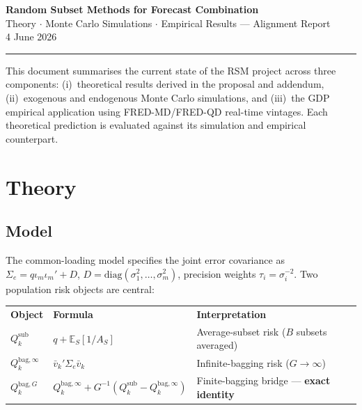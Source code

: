 \documentclass[11pt,a4paper]{article}
\newcommand{\Qbaginf}{Q_k^{\mathrm{bag},\infty}}
\newcommand{\Qbag}{Q_k^{\mathrm{bag},G}}
\newcommand{\Qsub}{Q_k^{\mathrm{sub}}}
\newcommand{\Sige}{\Sigma_e}
\begin{document}
\begin{center}
  {\LARGE\bfseries\color{myblue} Random Subset Methods for Forecast Combination}\\[6pt]
  {\large\color{dgrey} Theory \(\cdot\) Monte Carlo Simulations \(\cdot\) Empirical Results — Alignment Report}\\[4pt]
  {\normalsize\color{dgrey} 4 June 2026}
\end{center}
\vspace{-4pt}
{\color{myblue}\hrule height 1.5pt}
\vspace{8pt}

\noindent
This document summarises the current state of the RSM project across three components:
(i)~theoretical results derived in the proposal and addendum,
(ii)~exogenous and endogenous Monte Carlo simulations, and
(iii)~the GDP empirical application using FRED-MD/FRED-QD real-time vintages.
Each theoretical prediction is evaluated against its simulation and empirical counterpart.

\section{Theory}

\subsection{Model}

The common-loading model specifies the joint error covariance as
\(\Sige = q\iota_m\iota_m' + D\),
\(D = \mathrm{diag}(\sigma_1^2,\ldots,\sigma_m^2)\),
precision weights \(\tau_i = \sigma_i^{-2}\).
Two population risk objects are central:

\smallskip
\begin{tabular}{L{3.2cm} L{5.4cm} L{6.8cm}}
\color{white}\bfseries Object &
\color{white}\bfseries Formula &
\color{white}\bfseries Interpretation \\
\(\Qsub\) & \(q + \mathbb{E}_S[1/A_S]\) & Average-subset risk (\(B\) subsets averaged) \\
\(\Qbaginf\) & \(\bar{v}_k'\Sige\bar{v}_k\) & Infinite-bagging risk (\(G\to\infty\)) \\
\(\Qbag\) & \(\Qbaginf + G^{-1}\!\left(\Qsub - \Qbaginf\right)\) & Finite-bagging bridge — \textbf{exact identity} \\
\end{tabular}
\end{document}
